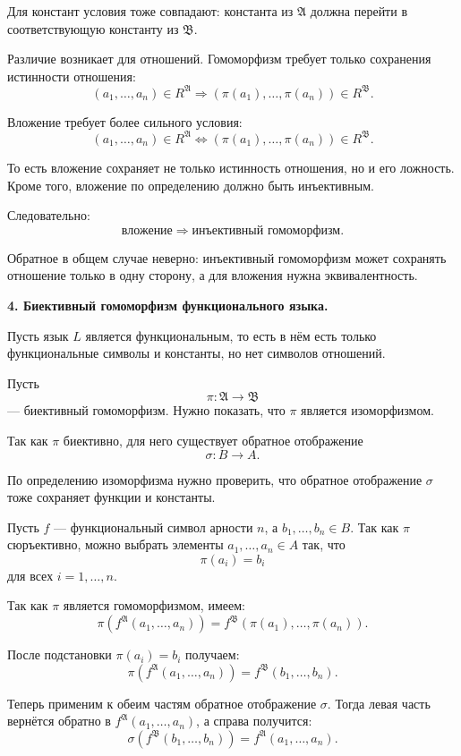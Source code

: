 \documentclass[12pt,a4paper,oneside,openany]{book}
\theoremstyle{definition}
\theoremstyle{plain}
\theoremstyle{remark}
\begin{document}
Для констант условия тоже совпадают: константа из $\mathfrak A$ должна перейти в соответствующую константу из $\mathfrak B$.

Различие возникает для отношений. Гомоморфизм требует только сохранения истинности отношения:
\[
(a_1,\dots,a_n)\in R^{\mathfrak A}
\Rightarrow
(\pi(a_1),\dots,\pi(a_n))\in R^{\mathfrak B}.
\]

Вложение требует более сильного условия:
\[
(a_1,\dots,a_n)\in R^{\mathfrak A}
\iff
(\pi(a_1),\dots,\pi(a_n))\in R^{\mathfrak B}.
\]

То есть вложение сохраняет не только истинность отношения, но и его ложность. Кроме того, вложение по определению должно быть инъективным.

Следовательно:
\[
\text{вложение}
\Rightarrow
\text{инъективный гомоморфизм}.
\]

Обратное в общем случае неверно: инъективный гомоморфизм может сохранять отношение только в одну сторону, а для вложения нужна эквивалентность.

\textbf{4. Биективный гомоморфизм функционального языка.}

Пусть язык $L$ является функциональным, то есть в нём есть только функциональные символы и константы, но нет символов отношений.

Пусть
\[
\pi:\mathfrak A\to\mathfrak B
\]
— биективный гомоморфизм. Нужно показать, что $\pi$ является изоморфизмом.

Так как $\pi$ биективно, для него существует обратное отображение
\[
\sigma:B\to A.
\]

По определению изоморфизма нужно проверить, что обратное отображение $\sigma$ тоже сохраняет функции и константы.

Пусть $f$ — функциональный символ арности $n$, а $b_1,\dots,b_n\in B$. Так как $\pi$ сюръективно, можно выбрать элементы $a_1,\dots,a_n\in A$ так, что
\[
\pi(a_i)=b_i
\]
для всех $i=1,\dots,n$.

Так как $\pi$ является гомоморфизмом, имеем:
\[
\pi(f^{\mathfrak A}(a_1,\dots,a_n))
=
f^{\mathfrak B}(\pi(a_1),\dots,\pi(a_n)).
\]

После подстановки $\pi(a_i)=b_i$ получаем:
\[
\pi(f^{\mathfrak A}(a_1,\dots,a_n))
=
f^{\mathfrak B}(b_1,\dots,b_n).
\]

Теперь применим к обеим частям обратное отображение $\sigma$. Тогда левая часть вернётся обратно в $f^{\mathfrak A}(a_1,\dots,a_n)$, а справа получится:
\[
\sigma(f^{\mathfrak B}(b_1,\dots,b_n))
=
f^{\mathfrak A}(a_1,\dots,a_n).
\]
\end{document}

